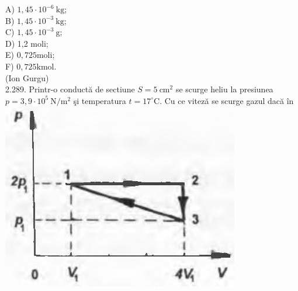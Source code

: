 \documentclass[10pt]{article}
\begin{document}
A) $1,45 \cdot 10^{-6} \mathrm{~kg}$;\\
B) $1,45 \cdot 10^{-3} \mathrm{~kg}$;\\
C) $1,45 \cdot 10^{-3} \mathrm{~g}$;\\
D) 1,2 moli;\\
E) $0,725 \mathrm{moli}$;\\
F) $0,725 \mathrm{kmol}$.\\
(Ion Gurgu)\\
2.289. Printr-o conductă de sectiune $S=5 \mathrm{~cm}^{2}$ se scurge heliu la presiunea $p=3,9 \cdot 10^{5} \mathrm{~N} / \mathrm{m}^{2}$ şi temperatura $t=17^{\circ} \mathrm{C}$. Cu ce viteză se scurge gazul dacă în\\
\includegraphics[max width=\textwidth, center]{2025_07_01_5b3ff9fa0d508c8e9f17g-138}
\end{document}
